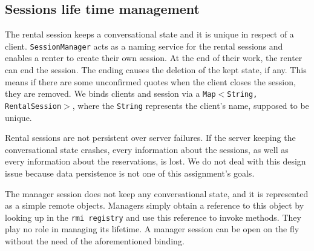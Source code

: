 \subsection{Sessions life time management}
The rental session keeps a conversational state and it is unique in respect of a client. \texttt{SessionManager} acts as a naming service for the rental sessions and enables a renter to create their own session. At the end of their work, the renter can end the session. The ending causes the deletion of the kept state, if any. This means if there are some unconfirmed quotes when the client closes the session, they are removed. We binds clients and session via a \texttt{Map$<$String, RentalSession$>$}, where the \texttt{String} represents the client's name, supposed to be unique.

Rental sessions are not persistent over server failures. If the server keeping the conversational state crashes, every information about the sessions, as well as every information about the reservations, is lost. We do not deal with this design issue because data persistence is not one of this assignment's goals. 

The manager session does not keep any conversational state, and it is represented as a simple remote objects. Managers simply obtain a reference to this object by looking up in the \texttt{rmi registry} and use this reference to invoke methods. They play no role in managing its lifetime. A manager session can be open on the fly without the need of the aforementioned binding.

